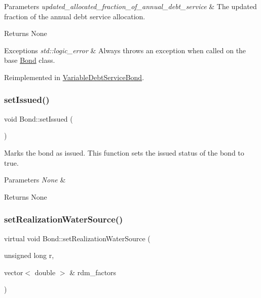 \begin{DoxyParams}{Parameters}
{\em updated\+\_\+allocated\+\_\+fraction\+\_\+of\+\_\+annual\+\_\+debt\+\_\+service} & The updated fraction of the annual debt service allocation.\\
\hline
\end{DoxyParams}
\begin{DoxyReturn}{Returns}
None
\end{DoxyReturn}

\begin{DoxyExceptions}{Exceptions}
{\em std\+::logic\+\_\+error} & Always throws an exception when called on the base {\ttfamily \mbox{\hyperlink{classBond}{Bond}}} class. \\
\hline
\end{DoxyExceptions}


Reimplemented in \mbox{\hyperlink{classVariableDebtServiceBond_a692563150053b280f6e1ef23fd47c117}{Variable\+Debt\+Service\+Bond}}.

\mbox{\label{classBond_a573de514b0044cec6a76bb63b098b40a}} 
\subsubsection{\texorpdfstring{set\+Issued()}{setIssued()}}
{\footnotesize\ttfamily void Bond\+::set\+Issued (\begin{DoxyParamCaption}{ }\end{DoxyParamCaption})}



Marks the bond as issued. This function sets the {\ttfamily issued} status of the bond to {\ttfamily true}. 


\begin{DoxyParams}{Parameters}
{\em None} & \\
\hline
\end{DoxyParams}
\begin{DoxyReturn}{Returns}
None 
\end{DoxyReturn}
\mbox{\label{classBond_aadfa02c42f31c590cee31a455bdda0b2}} 
\subsubsection{\texorpdfstring{set\+Realization\+Water\+Source()}{setRealizationWaterSource()}}
{\footnotesize\ttfamily virtual void Bond\+::set\+Realization\+Water\+Source (\begin{DoxyParamCaption}\item[{unsigned long}]{r,  }\item[{vector$<$ double $>$ \&}]{rdm\+\_\+factors }\end{DoxyParamCaption})\hspace{0.3cm}{\ttfamily [virtual]}}



